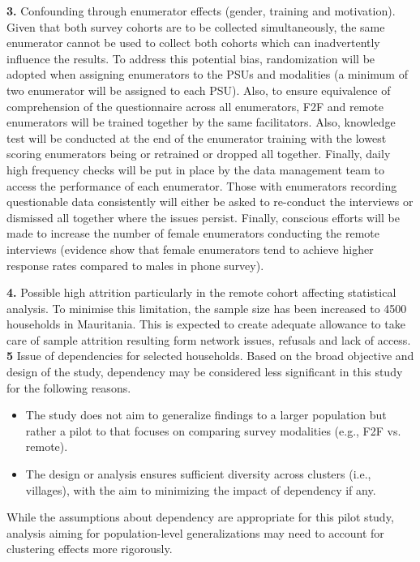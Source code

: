 \documentclass[11pt,harvard]{article}
\begin{document}
	\textbf{3.}	Confounding through enumerator effects (gender, training and motivation). Given that both survey cohorts are to be collected simultaneously, the same enumerator cannot be used to collect both cohorts which can inadvertently influence the results. To address this potential bias, randomization will be adopted when assigning enumerators to the PSUs and modalities (a minimum of two enumerator will be assigned to each PSU). Also, to ensure equivalence of comprehension of the questionnaire across all enumerators, F2F and remote enumerators will be trained together by the same facilitators. Also, knowledge test will be conducted at the end of the enumerator training with the lowest scoring enumerators being or retrained or dropped all together. Finally, daily high frequency checks will be put in place by the data management team to access the performance of each enumerator. Those with enumerators recording questionable data consistently will either be asked to re-conduct the interviews or dismissed all together where the issues persist. Finally, conscious efforts will be made to increase the number of female enumerators conducting the remote interviews (evidence show that female enumerators tend to achieve higher response rates compared to males in phone survey).
	
	\textbf{4.} Possible high attrition particularly in the remote cohort affecting statistical analysis. To minimise this limitation, the sample size has been increased to 4500 households in Mauritania. This is expected to create adequate allowance to take care of sample attrition resulting form network issues, refusals and lack of access.
	\textbf{5} Issue of dependencies for selected households. Based on the broad objective and design of the study, dependency may be considered less significant in this study for the following reasons.
	\begin{itemize}
		\item The study does not aim to generalize findings to a larger population but rather a pilot to that focuses on comparing survey modalities (e.g., F2F vs. remote).
		\item The design or analysis ensures sufficient diversity across clusters (i.e., villages), with the aim to minimizing the impact of dependency if any.
	\end{itemize}
	
	While the assumptions about dependency are appropriate for this pilot study, analysis aiming for population-level generalizations may need to account for clustering effects more rigorously.
	
	
	
\end{document}
